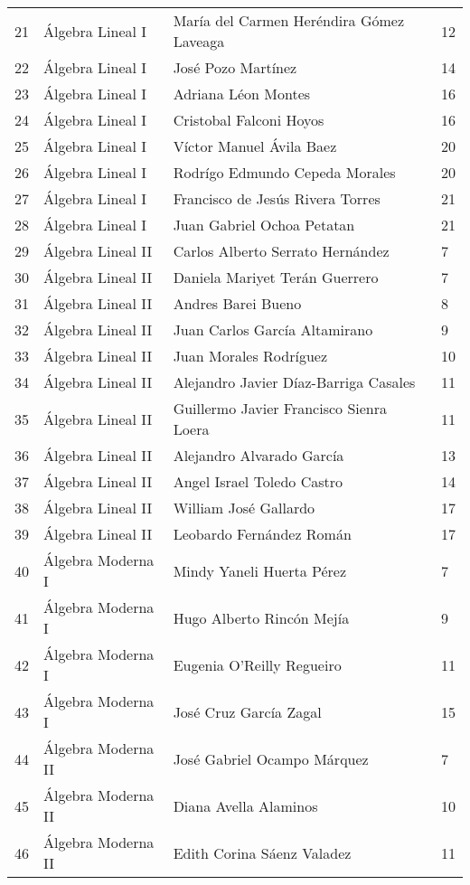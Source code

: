 \begin{table}[ht]
\begin{tabular}{rlll}
  21 & Álgebra Lineal I & María del Carmen Heréndira Gómez Laveaga & 12 \\ 
  22 & Álgebra Lineal I & José Pozo Martínez & 14 \\ 
  23 & Álgebra Lineal I & Adriana Léon Montes & 16 \\ 
  24 & Álgebra Lineal I & Cristobal Falconi Hoyos & 16 \\ 
  25 & Álgebra Lineal I & Víctor Manuel Ávila Baez & 20 \\ 
  26 & Álgebra Lineal I & Rodrígo Edmundo Cepeda Morales & 20 \\ 
  27 & Álgebra Lineal I & Francisco de Jesús Rivera Torres & 21 \\ 
  28 & Álgebra Lineal I & Juan Gabriel Ochoa Petatan & 21 \\ 
  29 & Álgebra Lineal II & Carlos Alberto Serrato Hernández & 7 \\ 
  30 & Álgebra Lineal II & Daniela Mariyet Terán Guerrero & 7 \\ 
  31 & Álgebra Lineal II & Andres Barei Bueno & 8 \\ 
  32 & Álgebra Lineal II & Juan Carlos García Altamirano & 9 \\ 
  33 & Álgebra Lineal II & Juan Morales Rodríguez & 10 \\ 
  34 & Álgebra Lineal II & Alejandro Javier Díaz-Barriga Casales & 11 \\ 
  35 & Álgebra Lineal II & Guillermo Javier Francisco Sienra Loera & 11 \\ 
  36 & Álgebra Lineal II & Alejandro Alvarado García & 13 \\ 
  37 & Álgebra Lineal II & Angel Israel Toledo Castro & 14 \\ 
  38 & Álgebra Lineal II & William José Gallardo & 17 \\ 
  39 & Álgebra Lineal II & Leobardo Fernández Román & 17 \\ 
  40 & Álgebra Moderna I & Mindy Yaneli Huerta Pérez & 7 \\ 
  41 & Álgebra Moderna I & Hugo Alberto Rincón Mejía & 9 \\ 
  42 & Álgebra Moderna I & Eugenia O'Reilly Regueiro & 11 \\ 
  43 & Álgebra Moderna I & José Cruz García Zagal & 15 \\ 
  44 & Álgebra Moderna II & José Gabriel Ocampo Márquez & 7 \\ 
  45 & Álgebra Moderna II & Diana Avella Alaminos & 10 \\ 
  46 & Álgebra Moderna II & Edith Corina Sáenz Valadez & 11 \\ 

\end{tabular}
\end{table}
